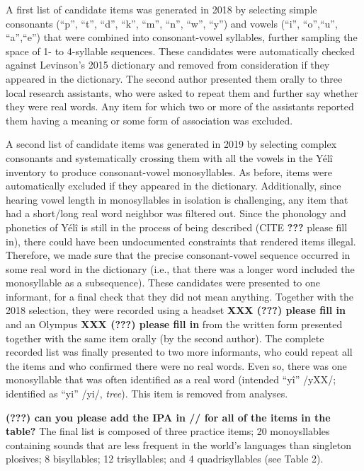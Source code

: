 \documentclass[english,,man]{apa6}
\begin{document}
A first list of candidate items was generated in 2018 by selecting simple consonants (\enquote{p}, \enquote{t}, \enquote{d}, \enquote{k}, \enquote{m}, \enquote{n}, \enquote{w}, \enquote{y}) and vowels (\enquote{i}, \enquote{o},\enquote{u}, \enquote{a},\enquote{e}) that were combined into consonant-vowel syllables, further sampling the space of 1- to 4-syllable sequences. These candidates were automatically checked against Levinson's 2015 dictionary and removed from consideration if they appeared in the dictionary. The second author presented them orally to three local research assistants, who were asked to repeat them and further say whether they were real words. Any item for which two or more of the assistants reported them having a meaning or some form of association was excluded.

A second list of candidate items was generated in 2019 by selecting complex consonants and systematically crossing them with all the vowels in the Yélî inventory to produce consonant-vowel monosyllables. As before, items were automatically excluded if they appeared in the dictionary. Additionally, since hearing vowel length in monosyllables in isolation is challenging, any item that had a short/long real word neighbor was filtered out. Since the phonology and phonetics of Yélî is still in the process of being described (CITE {\textbf{???}} please fill in), there could have been undocumented constraints that rendered items illegal. Therefore, we made sure that the precise consonant-vowel sequence occurred in some real word in the dictionary (i.e., that there was a longer word included the monosyllable as a subsequence). These candidates were presented to one informant, for a final check that they did not mean anything. Together with the 2018 selection, they were recorded using a headset \textbf{XXX ({\textbf{???}}) please fill in} and an Olympus \textbf{XXX ({\textbf{???}}) please fill in} from the written form presented together with the same item orally (by the second author). The complete recorded list was finally presented to two more informants, who could repeat all the items and who confirmed there were no real words. Even so, there was one monosyllable that was often identified as a real word (intended \enquote{yî} /yXX/; identified as \enquote{yi} /yi/, \emph{tree}). This item is removed from analyses.

\textbf{({\textbf{???}}) can you please add the IPA in // for all of the items in the table?}
The final list is composed of three practice items; 20 monoysllables containing sounds that are less frequent in the world's languages than singleton plosives; 8 bisyllables; 12 trisyllables; and 4 quadrisyllables (see Table 2).
\end{document}
